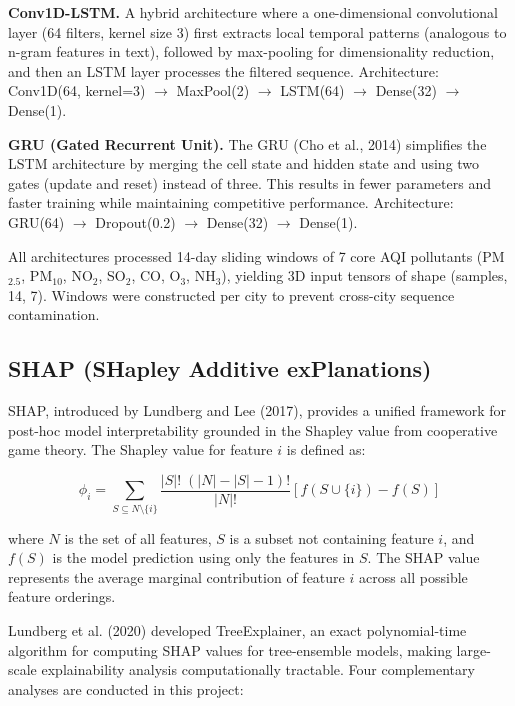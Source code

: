 \documentclass[12pt,a4paper]{report}
\begin{document}
\textbf{Conv1D-LSTM.} A hybrid architecture where a one-dimensional convolutional layer (64 filters, kernel size 3) first extracts local temporal patterns (analogous to n-gram features in text), followed by max-pooling for dimensionality reduction, and then an LSTM layer processes the filtered sequence. Architecture: Conv1D(64, kernel=3) $\rightarrow$ MaxPool(2) $\rightarrow$ LSTM(64) $\rightarrow$ Dense(32) $\rightarrow$ Dense(1).

\textbf{GRU (Gated Recurrent Unit).} The GRU (Cho et al., 2014) simplifies the LSTM architecture by merging the cell state and hidden state and using two gates (update and reset) instead of three. This results in fewer parameters and faster training while maintaining competitive performance. Architecture: GRU(64) $\rightarrow$ Dropout(0.2) $\rightarrow$ Dense(32) $\rightarrow$ Dense(1).

All architectures processed 14-day sliding windows of 7 core AQI pollutants (PM$_{2.5}$, PM$_{10}$, NO$_2$, SO$_2$, CO, O$_3$, NH$_3$), yielding 3D input tensors of shape (samples, 14, 7). Windows were constructed per city to prevent cross-city sequence contamination.

\subsection{SHAP (SHapley Additive exPlanations)}

SHAP, introduced by Lundberg and Lee (2017), provides a unified framework for post-hoc model interpretability grounded in the Shapley value from cooperative game theory. The Shapley value for feature $i$ is defined as:

\begin{equation}
\phi_i = \sum_{S \subseteq N \setminus \{i\}} \frac{|S|! \; (|N|-|S|-1)!}{|N|!} \left[ f(S \cup \{i\}) - f(S) \right]
\end{equation}

\noindent where $N$ is the set of all features, $S$ is a subset not containing feature $i$, and $f(S)$ is the model prediction using only the features in $S$. The SHAP value represents the average marginal contribution of feature $i$ across all possible feature orderings.

Lundberg et al. (2020) developed TreeExplainer, an exact polynomial-time algorithm for computing SHAP values for tree-ensemble models, making large-scale explainability analysis computationally tractable. Four complementary analyses are conducted in this project:
\end{document}
